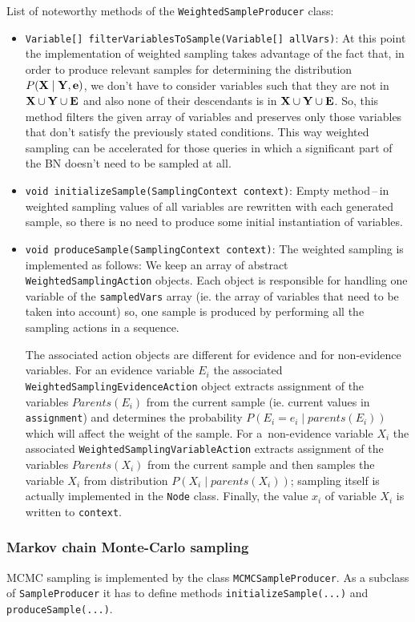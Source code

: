 \documentclass[english,cover]{fitthesis} %
\newcommand{\srccode}[1]{{\tt #1}}         %
\newcommand{\vars}[1]{{\bold{#1}}}         %
\begin{document}
\medskip
List of noteworthy methods of the \srccode{WeightedSampleProducer} class:
\begin{itemize}
	\item \srccode{Variable[] filterVariablesToSample(Variable[] allVars)}: At this point the implementation of weighted sampling takes advantage of the fact that, in order to produce relevant samples for determining the distribution $P(\vars{X} \mid \vars{Y}, \vars{e})$, we don't have to consider variables such that they are not in $\vars{X} \cup \vars{Y} \cup \vars{E}$ and also none of their descendants is in $\vars{X} \cup \vars{Y} \cup \vars{E}$. So, this method filters the given array of variables and preserves only those variables that don't satisfy the previously stated conditions. This way weighted sampling can be accelerated for those queries in which a significant part of the BN doesn't need to be sampled at all.
	\item \srccode{void initializeSample(SamplingContext context)}: Empty method\,--\,in weighted sampling values of all variables are rewritten with each generated sample, so there is no need to produce some initial instantiation of variables.
	\item \srccode{void produceSample(SamplingContext context)}: The weighted sampling is implemented as follows: We keep an array of abstract \srccode{WeightedSamplingAction} objects. Each object is responsible for handling one variable of the \srccode{sampledVars} array (ie. the array of variables that need to be taken into account) so, one sample is produced by performing all the sampling actions in a sequence.
	
	The associated action objects are different for evidence and for non-evidence variables.	For an evidence variable $E_i$ the associated \srccode{WeightedSamplingEvidenceAction} object extracts assignment of the variables $Parents(E_i)$ from the current sample (ie. current values in \srccode{assignment}) and determines the probability $P(E_i = e_i \mid parents(E_i))$ which will affect the weight of the sample.
	For a~non-evidence variable $X_i$ the associated \srccode{WeightedSamplingVariableAction} extracts assignment of the variables $Parents(X_i)$ from the current sample and then samples the variable $X_i$ from distribution $P(X_i \mid parents(X_i))$; sampling itself is actually implemented in the \srccode{Node} class. Finally, the value $x_i$ of variable $X_i$ is written to \srccode{context}.
\end{itemize}


\subsubsection{Markov chain Monte-Carlo sampling}
MCMC sampling is implemented by the class \srccode{MCMCSampleProducer}. As a subclass of \srccode{SampleProducer} it has to define methods \srccode{initializeSample(...)} and \srccode{produceSample(...)}.
\end{document}
